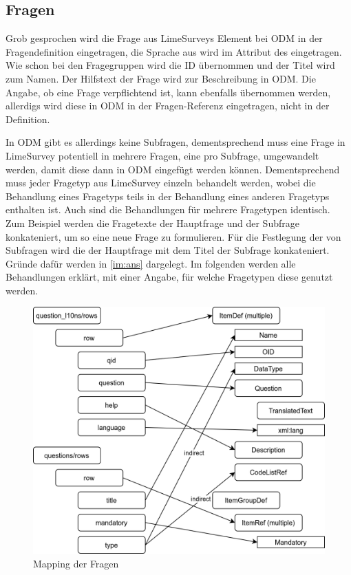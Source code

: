 \subsection{Fragen}

Grob gesprochen wird die Frage aus LimeSurveys  Element bei ODM in  der Fragendefinition eingetragen, die Sprache aus  wird im Attribut  des  eingetragen.
Wie schon bei den Fragegruppen wird die ID übernommen und der Titel wird zum Namen.
Der Hilfstext der Frage wird zur Beschreibung in ODM.
Die Angabe, ob eine Frage verpflichtend ist, kann ebenfalls übernommen werden, allerdigs wird diese in ODM in der Fragen-Referenz eingetragen, nicht in der Definition.

In ODM gibt es allerdings keine Subfragen, dementsprechend muss eine Frage in LimeSurvey potentiell in mehrere Fragen, eine pro Subfrage, umgewandelt werden, damit diese dann in ODM eingefügt werden können.
Dementsprechend muss jeder Fragetyp aus LimeSurvey einzeln behandelt werden, wobei die Behandlung eines Fragetyps teils in der Behandlung eines anderen Fragetyps enthalten ist.
Auch sind die Behandlungen für mehrere Fragetypen identisch.
Zum Beispiel werden die Fragetexte der Hauptfrage und der Subfrage konkateniert, um so eine neue Frage  zu formulieren.
Für die Festlegung der  von Subfragen wird die  der Hauptfrage mit dem Titel der Subfrage konkateniert.
Gründe dafür werden in \cref{im:ans} dargelegt.
Im folgenden werden alle Behandlungen erklärt, mit einer Angabe, für welche Fragetypen diese genutzt werden.

\begin{figure}[h]
			\centering
			\includegraphics[width=.80\textwidth]{./img/m_questions.png}
			\caption{Mapping der Fragen}
\end{figure}

